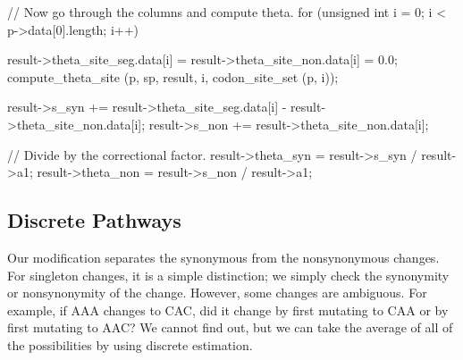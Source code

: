\documentclass{article}
\begin{document}
\begin{ccode}
{  // Now go through the columns and compute theta.
  for (unsigned int i = 0; i < p->data[0].length; i++) {
    result->theta_site_seg.data[i] = result->theta_site_non.data[i] = 0.0;
    compute_theta_site (p, sp, result, i, codon_site_set (p, i));
    
    result->s_syn += result->theta_site_seg.data[i] - result->theta_site_non.data[i];
    result->s_non += result->theta_site_non.data[i];
  }

  // Divide by the correctional factor.
  result->theta_syn = result->s_syn / result->a1;
  result->theta_non = result->s_non / result->a1;
}
\end{ccode}

    \subsection{Discrete Pathways}
      \label{sec:pathways}

      Our modification separates the synonymous from the nonsynonymous changes.
      For singleton changes, it is a simple distinction; we simply check the
      synonymity or nonsynonymity of the change. However, some changes are
      ambiguous. For example, if AAA changes to CAC, did it change by first
      mutating to CAA or by first mutating to AAC? We cannot find out, but we
      can take the average of all of the possibilities by using discrete
      estimation.
\end{document}
